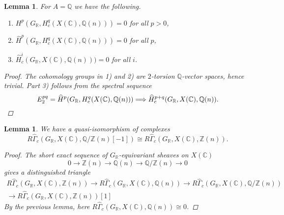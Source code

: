 \documentclass[leqno,12pt]{article}
\theoremstyle{plain}
\newtheorem{lemma}[theorem]{\indent\sc Lemma}
\theoremstyle{definition}
\newcommand{\CC}{\mathbb{C}}
\newcommand{\QQ}{\mathbb{Q}}
\newcommand{\RR}{\mathbb{R}}
\newcommand{\ZZ}{\mathbb{Z}}
\begin{document}
\begin{lemma}
  For $A = \QQ$ we have the following.

  \begin{enumerate}
  \item[$1)$] $H^p (G_\RR, H_c^q (X (\CC), \QQ (n))) = 0$ for all $p > 0$,

  \item[$2)$] $\widehat{H}^p (G_\RR, H_c^q (X (\CC), \QQ (n))) = 0$ for all $p$,

  \item[$3)$] $\widehat{H}^i_c (G_\RR, X (\CC), \QQ (n))) = 0$ for all $i$.
  \end{enumerate}

  \begin{proof}
    The cohomology groups in 1) and 2) are $2$-torsion $\QQ$-vector spaces,
    hence trivial. Part 3) follows from the spectral sequence
    \[ E_2^{pq} = \widehat{H}^p (G_\RR, H^q_c (X (\CC), \QQ (n)))
    \Longrightarrow
    \widehat{H}^{p+q}_c (G_\RR, X (\CC), \QQ (n)). \qedhere \]
  \end{proof}
\end{lemma}

\begin{lemma}
  We have a quasi-isomorphism of complexes
  \[ R\widehat{\Gamma}_c (G_\RR, X (\CC), \QQ/\ZZ (n) [-1]) \cong
  R\widehat{\Gamma}_c (G_\RR, X (\CC), \ZZ (n)).\]

  \begin{proof}
    The short exact sequence of $G_\RR$-equivariant sheaves on $X (\CC)$
    $$0 \to \ZZ (n) \to \QQ (n) \to \QQ/\ZZ (n) \to 0$$
    gives a distinguished triangle
    \begin{multline*}
      R\widehat{\Gamma}_c (G_\RR, X (\CC), \ZZ (n)) \to
      R\widehat{\Gamma}_c (G_\RR, X (\CC), \QQ (n)) \to
      R\widehat{\Gamma}_c (G_\RR, X (\CC), \QQ/\ZZ (n)) \\
      \to R\widehat{\Gamma}_c (G_\RR, X (\CC), \ZZ (n)) [1]
    \end{multline*}
    By the previous lemma, here
    $R\widehat{\Gamma}_c (G_\RR, X (\CC), \QQ (n)) \cong 0$.
  \end{proof}
\end{lemma}
\end{document}
